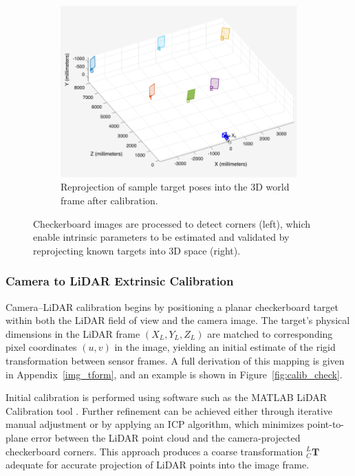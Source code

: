 \documentclass[../main.tex]{subfiles}
\begin{document}
\begin{figure}[htbp]
{\begin{subfigure}[t]{0.625\textwidth}
        \includegraphics[width=\textwidth]{Images/cam_calib_2.png}
        \caption{Reprojection of sample target poses into the 3D world frame after calibration.}
        \label{fig:cam_calib_2}
    \end{subfigure}%
}
\caption{Checkerboard images are processed to detect corners (left), which enable intrinsic parameters to be estimated and validated by reprojecting known targets into 3D space (right).}
\label{fig:cam_calib}
\end{figure}


\subsubsection{Camera to LiDAR Extrinsic Calibration} \label{camLidar_calib}

Camera–LiDAR calibration begins by positioning a planar checkerboard target within both the LiDAR field of view and the camera image.  
The target’s physical dimensions in the LiDAR frame $(X_L, Y_L, Z_L)$ are matched to corresponding pixel coordinates $(u,v)$ in the image, yielding an initial estimate of the rigid transformation between sensor frames.  
A full derivation of this mapping is given in Appendix~\ref{img_tform}, and an example is shown in Figure~\ref{fig:calib_check}.

Initial calibration is performed using software such as the MATLAB LiDAR Calibration tool \cite{matlab_calibration}.  
Further refinement can be achieved either through iterative manual adjustment or by applying an \ac{ICP} algorithm, which minimizes point-to-plane error between the LiDAR point cloud and the camera-projected checkerboard corners.  
This approach produces a coarse transformation $_{C}^{L}\mathbf{T}$ adequate for accurate projection of LiDAR points into the image frame.
\end{document}
